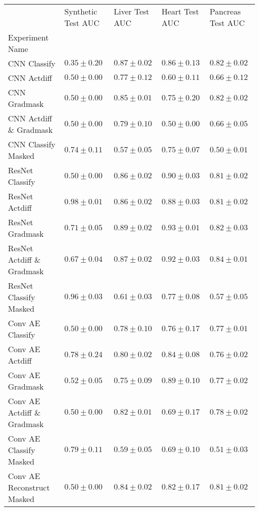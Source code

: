 \begin{tabular}{lllll}
\toprule
{} & Synthetic Test AUC & Liver Test AUC & Heart Test AUC & Pancreas Test AUC \\
Experiment Name  &                &                   &                     &                      \\
\midrule
CNN Classify              &  $0.35\pm0.20$ &     $0.87\pm0.02$ &       $0.86\pm0.13$ &        $0.82\pm0.02$ \\
CNN Actdiff      &  $0.50\pm0.00$ &     $0.77\pm0.12$ &       $0.60\pm0.11$ &        $0.66\pm0.12$ \\
CNN Gradmask     &  $0.50\pm0.00$ &     $0.85\pm0.01$ &       $0.75\pm0.20$ &        $0.82\pm0.02$ \\
CNN Actdiff \& Gradmask      &  $0.50\pm0.00$ &     $0.79\pm0.10$ &       $0.50\pm0.00$ &        $0.66\pm0.05$ \\
CNN Classify Masked          &  $0.74\pm0.11$ &     $0.57\pm0.05$ &       $0.75\pm0.07$ &        $0.50\pm0.01$ \\
\midrule
ResNet Classify   &  $0.50\pm0.00$ &     $0.86\pm0.02$ &       $0.90\pm0.03$ &        $0.81\pm0.02$ \\
ResNet Actdiff    &  $0.98\pm0.01$ &     $0.86\pm0.02$ &       $0.88\pm0.03$ &        $0.81\pm0.02$ \\
ResNet Gradmask  &  $0.71\pm0.05$ &     $0.89\pm0.02$ &       $0.93\pm0.01$ &        $0.82\pm0.03$ \\
ResNet Actdiff \& Gradmask   &  $0.67\pm0.04$ &     $0.87\pm0.02$ &       $0.92\pm0.03$ &        $0.84\pm0.01$ \\
ResNet Classify Masked       &  $0.96\pm0.03$ &     $0.61\pm0.03$ &       $0.77\pm0.08$ &        $0.57\pm0.05$ \\
\midrule
Conv AE Classify  &  $0.50\pm0.00$ &     $0.78\pm0.10$ &       $0.76\pm0.17$ &        $0.77\pm0.01$ \\
Conv AE Actdiff   &  $0.78\pm0.24$ &     $0.80\pm0.02$ &       $0.84\pm0.08$ &        $0.76\pm0.02$ \\
Conv AE Gradmask  &  $0.52\pm0.05$ &     $0.75\pm0.09$ &       $0.89\pm0.10$ &        $0.77\pm0.02$ \\
Conv AE Actdiff \& Gradmask      &  $0.50\pm0.00$ &     $0.82\pm0.01$ &       $0.69\pm0.17$ &        $0.78\pm0.02$ \\
Conv AE Classify Masked          &  $0.79\pm0.11$ &     $0.59\pm0.05$ &       $0.69\pm0.10$ &        $0.51\pm0.03$ \\
Conv AE Reconstruct Masked       &  $0.50\pm0.00$ &     $0.84\pm0.02$ &       $0.82\pm0.17$ &        $0.81\pm0.02$ \\

\end{tabular}
